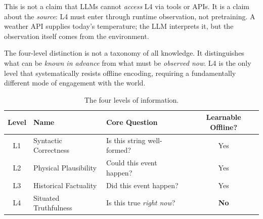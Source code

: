 This is not a claim that LLMs cannot \emph{access} L4 via tools or APIs. It is a claim about the \emph{source}: L4 must enter through runtime observation, not pretraining. A weather API supplies today's temperature; the LLM interprets it, but the observation itself comes from the environment.

The four-level distinction is not a taxonomy of all knowledge. It distinguishes what can be \emph{known in advance} from what must be \emph{observed now}. L4 is the only level that systematically resists offline encoding, requiring a fundamentally different mode of engagement with the world.

\begin{table}[t]
\centering
\caption{The four levels of information.}
\label{tab:hierarchy}
\small
\setlength{\tabcolsep}{3pt}
\begin{tabular}{c p{3.5cm} p{3.8cm} c}
\toprule
\textbf{Level} & \textbf{Name} & \textbf{Core Question} & \textbf{Learnable Offline?} \\
\midrule
L1 & Syntactic Correctness & Is this string well-formed? & Yes \\
L2 & Physical Plausibility & Could this event happen? & Yes \\
L3 & Historical Factuality & Did this event happen? & Yes \\
L4 & Situated Truthfulness & Is this true \emph{right now}? & \textbf{No} \\
\bottomrule
\end{tabular}
\end{table}

